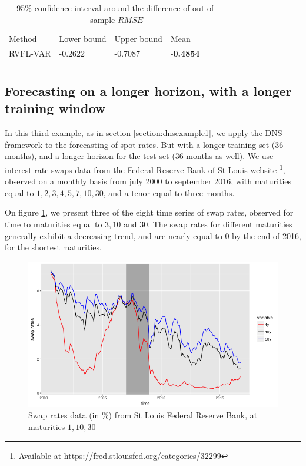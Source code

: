\begin{table}[!htb]
\begin{center}
\caption{95\% confidence interval around the difference of out-of-sample $RMSE$}
\label{tab:confint2}       %
\begin{tabular}{lllllll}
\hline\noalign{\smallskip}
Method & Lower bound & Upper bound  & Mean \\
\noalign{\smallskip}\hline\noalign{\smallskip}
  RVFL-VAR & -0.2622 & -0.7087 & -\textbf{0.4854} \\
\noalign{\smallskip}\hline
\end{tabular}
\end{center}
\end{table}

\subsection{Forecasting on a longer horizon, with a longer training window}

In this third example, as in section \ref{section:dnsexample1}, we apply the DNS framework to the forecasting of spot rates. But with a longer training set (36 months), and a longer horizon for the test set (36 months as well). We use interest rate swaps data from the Federal Reserve Bank of St Louis website \footnote{Available at https://fred.stlouisfed.org/categories/32299}, observed on a monthly basis from july 2000 to september 2016, with maturities equal to $1, 2, 3, 4, 5, 7, 10, 30$, and a tenor equal to three months. 

\medskip

On figure \ref{example3:1}, we present three of the eight time series of swap rates, observed for time to maturities equal to $3, 10$ and $30$. The swap rates for different maturities generally exhibit a decreasing trend, and are nearly equal to 0 by the end of 2016, for the shortest maturities. 

\begin{figure}[!htb]
\centering
  \includegraphics[width=14cm]{gfx/chapter-rvfl-mts/fredswaprates}
\caption{Swap rates data (in \%) from St Louis Federal Reserve Bank, at maturities $1, 10, 30$}
\label{example3:1}       %
\end{figure}

